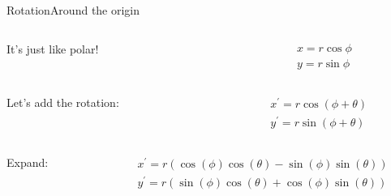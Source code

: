 \documentclass{beamer}
\begin{document}
\begin{frame}{Rotation}{Around the origin}

  \begin{columns}
    \begin{column}{0.3\textwidth}
      It's just like polar! \pause
    \end{column}
    \begin{column}{0.7\textwidth}
      \begin{align*}
        x = r\cos{\phi} \\
        y = r\sin{\phi}
      \end{align*} \pause
    \end{column}
  \end{columns}

  \begin{columns}
    \begin{column}{0.3\textwidth}
      Let's add the rotation: \pause
    \end{column}
    \begin{column}{0.7\textwidth}
      \begin{align*}
        x^{\prime} = r\cos{(\phi + \theta)} \\
        y^{\prime} = r\sin{(\phi + \theta)}
      \end{align*} \pause
    \end{column}
  \end{columns}

  
  \begin{columns}
    \begin{column}{0.3\textwidth}
      Expand: \pause
    \end{column}
    \begin{column}{0.7\textwidth}
      \begin{align*}
        x^{\prime} = r(\cos{(\phi)}\cos(\theta) - \sin{(\phi)}\sin(\theta)) \\
        y^{\prime} = r(\sin{(\phi)}\cos(\theta) + \cos{(\phi)}\sin(\theta))
      \end{align*} \pause
    \end{column}
  \end{columns}

\end{frame}
\end{document}
